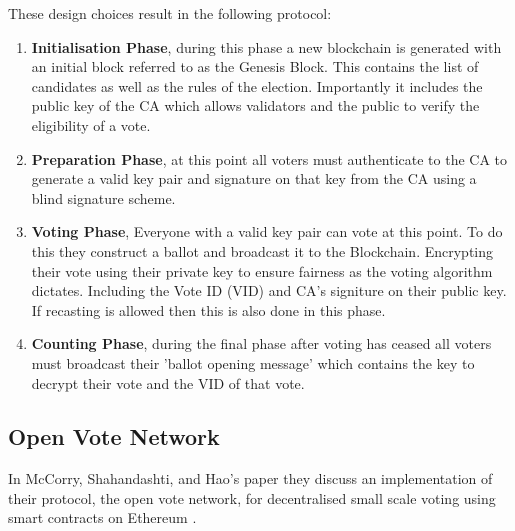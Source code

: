 \documentclass{llncs}
\begin{document}
These design choices result in the following protocol:
\begin{enumerate}
    \item \textbf{Initialisation Phase}, during this phase a new blockchain is generated with an initial block referred to as the Genesis Block. This contains the list of candidates as well as the rules of the election. Importantly it includes the public key of the CA which allows validators and the public to verify the eligibility of a vote.
    \item \textbf{Preparation Phase}, at this point all voters must authenticate to the CA to generate a valid key pair and signature on that key from the CA using a blind signature scheme.
    \item \textbf{Voting Phase}, Everyone with a valid key pair can vote at this point. To do this they construct a ballot and broadcast it to the Blockchain. Encrypting their vote using their private key to ensure fairness as the voting algorithm dictates. Including the Vote ID (VID) and CA's signiture on their public key. If recasting is allowed then this is also done in this phase.
    \item \textbf{Counting Phase}, during the final phase after voting has ceased all voters must broadcast their 'ballot opening message' which contains the key to decrypt their vote and the VID of that vote.
\end{enumerate}

\subsection{Open Vote Network}
In McCorry, Shahandashti, and Hao's paper \cite{boardroom2017ncl} they discuss an implementation of their protocol, the open vote network, for decentralised small scale voting using smart contracts on Ethereum \cite{wood2014ethereum}. 
\end{document}
